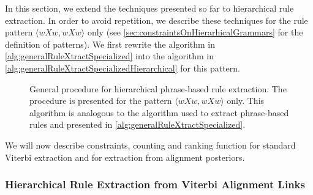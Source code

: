 In this section, we extend the techniques presented so far to hierarchical
rule extraction. In order to avoid repetition, we describe these
techniques for the rule pattern
$\langle w X w, w X w \rangle$
only (see \autoref{sec:constraintsOnHierarhicalGrammars} for the
definition of patterns). We first rewrite the algorithm in
\autoref{alg:generalRuleXtractSpecialized} into the algorithm in
\autoref{alg:generalRuleXtractSpecializedHierarchical} for this pattern.
%
\begin{figure}
  \begin{algorithmic}[1]
         
        \EndIf
         
           
          \EndIf
        \EndFor
         
           
          \EndIf
        \EndFor
      \EndFor
    \EndFunction
  \end{algorithmic}
  \caption{General procedure for hierarchical phrase-based rule extraction. The procedure is presented for the pattern $\langle w X w, w X w \rangle$ only. This algorithm is
  analogous to the algorithm used to extract phrase-based rules and presented
  in \autoref{alg:generalRuleXtractSpecialized}.}
  \label{alg:generalRuleXtractSpecializedHierarchical}
\end{figure}
%
We will now describe constraints, counting and ranking function for
standard Viterbi extraction and for extraction from alignment posteriors.

\subsubsection{Hierarchical Rule Extraction from Viterbi Alignment Links}


